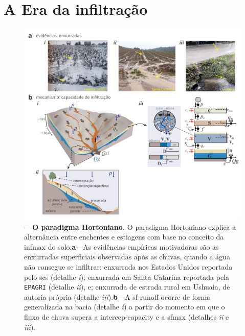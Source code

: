\documentclass[./main.tex]{subfiles}
\begin{document}
\section{A Era da infiltração} \label{sec:hydro:mechs}

\begin{figure}[t!] 
\centering				
\includegraphics[width=0.98\linewidth]{figs/fig_horton.jpg}		
\caption[O \gls{paradigma} Hortoniano]
{
\textbf{---\;O \gls{paradigma} Hortoniano.} O \gls{paradigma} Hortoniano explica a alternância entre enchentes e estiagens com base no conceito da \gls{infmax} do solo.\;\textbf{a}\;---\;As evidências empíricas motivadoras são as enxurradas superficiais observadas após as chuvas, quando a água não consegue se infiltrar: enxurrada nos Estados Unidos reportada pelo \acrshort{scs} \cite{strahler1986} (detalhe \textrm{\textit{i}}); enxurrada em Santa Catarina reportada pela \texttt{EPAGRI} \cite{epagri2024} (detalhe \textrm{\textit{ii}}), e; enxurrada de estrada rural em Ushuaia, de autoria própria (detalhe \textrm{\textit{iii}}).\;\textbf{b}\;---\;A \gls{sf-runoff} ocorre de forma generalizada na bacia (detalhe \textrm{\textit{i}}) a partir do momento em que o fluxo de chuva supera a \gls{intercep-capacity} e a \gls{sfmax} (detalhes \textrm{\textit{ii}} e \textrm{\textit{iii}}).
}
\label{fig:hydro:horton} 		
\end{figure}
\end{document}
